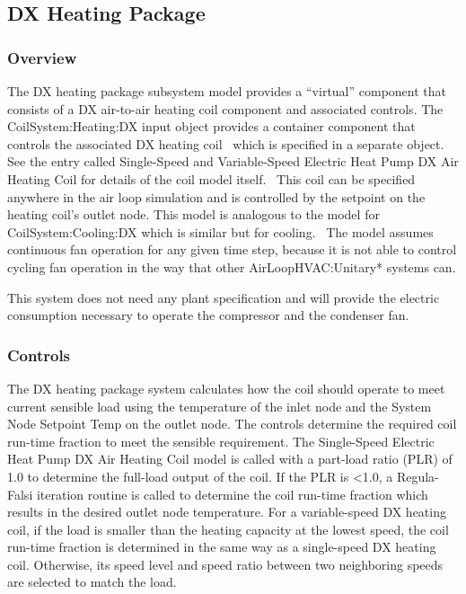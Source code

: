 \subsection{DX Heating Package}\label{dx-heating-package}

\subsubsection{Overview}\label{overview-6}

The DX heating package subsystem model provides a ``virtual'' component that consists of a DX air-to-air heating coil component and associated controls. The CoilSystem:Heating:DX input object provides a container component that controls the associated DX heating coil~ which is specified in a separate object. See the entry called Single-Speed and Variable-Speed Electric Heat Pump DX Air Heating Coil for details of the coil model itself.~ This coil can be specified anywhere in the air loop simulation and is controlled by the setpoint on the heating coil's outlet node. This model is analogous to the model for CoilSystem:Cooling:DX which is similar but for cooling.~ The model assumes continuous fan operation for any given time step, because it is not able to control cycling fan operation in the way that other AirLoopHVAC:Unitary* systems can.

This system does not need any plant specification and will provide the electric consumption necessary to operate the compressor and the condenser fan.

\subsubsection{Controls}\label{controls-2}

The DX heating package system calculates how the coil should operate to meet current sensible load using the temperature of the inlet node and the System Node Setpoint Temp on the outlet node. The controls determine the required coil run-time fraction to meet the sensible requirement. The Single-Speed Electric Heat Pump DX Air Heating Coil model is called with a part-load ratio (PLR) of 1.0 to determine the full-load output of the coil. If the PLR is \textless{}1.0, a Regula-Falsi iteration routine is called to determine the coil run-time fraction which results in the desired outlet node temperature. For a variable-speed DX heating coil, if the load is smaller than the heating capacity at the lowest speed, the coil run-time fraction is determined in the same way as a single-speed DX heating coil. Otherwise, its speed level and speed ratio between two neighboring speeds are selected to match the load.


